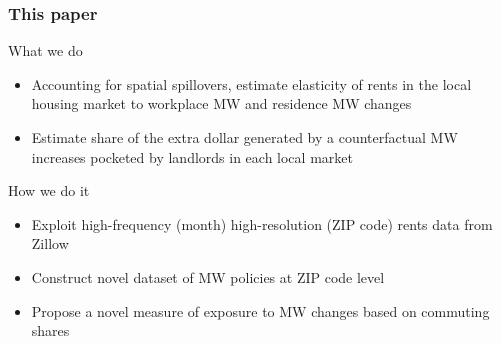 \documentclass[aspectratio=169, t]{beamer}
\begin{document}
\begin{frame}
    \frametitle{This paper}
    
    What we do
    \begin{itemize}
        \vspace{.5mm} \item Accounting for spatial spillovers, estimate 
        elasticity of rents in the local housing market to
         {\color{blue} workplace MW} and {\color{red} residence MW} changes
        \vspace{.5mm} \item Estimate share of the extra dollar generated by a
        counterfactual MW increases pocketed by landlords in each local market
    \end{itemize}
    
    \vspace{3mm}
    \pause
    How we do it
    \begin{itemize}
        \vspace{.5mm} \item Exploit high-frequency (month) high-resolution 
        (ZIP code) rents data from Zillow
        \vspace{.5mm} \item Construct novel dataset of MW policies at ZIP code level
        \vspace{.5mm} \item Propose a novel measure of exposure to MW changes 
        based on commuting shares
    \end{itemize}
\end{frame}
\end{document}
